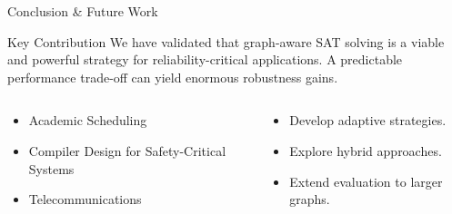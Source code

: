 \documentclass[11pt]{beamer}
\begin{document}
\begin{frame}{Conclusion \& Future Work}
    \begin{block}{Key Contribution}
        We have validated that graph-aware SAT solving is a viable and powerful strategy for reliability-critical applications. A predictable performance trade-off can yield enormous robustness gains.
    \end{block}
    \begin{columns}[T]
        \begin{column}{0.5\textwidth}
            \begin{exampleblock}{}
                \begin{itemize}
                    \item Academic Scheduling
                    \item Compiler Design for Safety-Critical Systems
                    \item Telecommunications
                \end{itemize}
            \end{exampleblock}
            \vspace{0.5cm}
        \end{column}
        \begin{column}{0.5\textwidth}
            \begin{block}{}
                \begin{itemize}
                    \item Develop adaptive strategies.
                    \item Explore hybrid approaches.
                    \item Extend evaluation to larger graphs.
                \end{itemize}
            \end{block}
            \vspace{0.5cm}
        \end{column}
    \end{columns}
\end{frame}
\end{document}
